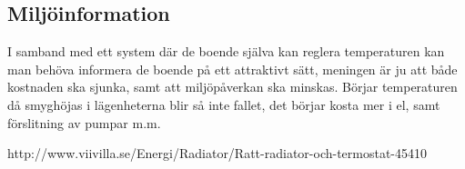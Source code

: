 \subsection{Miljöinformation}
I samband med ett system där de boende själva kan reglera temperaturen kan man behöva informera de boende på ett attraktivt sätt, meningen är ju att både kostnaden ska sjunka, samt att miljöpåverkan ska minskas. Börjar temperaturen då smyghöjas i lägenheterna blir så inte fallet, det börjar kosta mer i el, samt förslitning av pumpar m.m.

 
http://www.viivilla.se/Energi/Radiator/Ratt-radiator-och-termostat-45410
 


